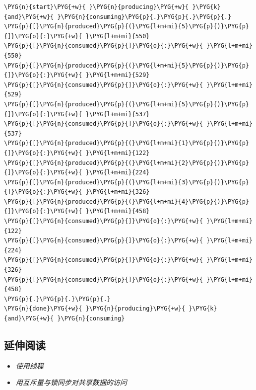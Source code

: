 \begin{codeblockbg}
\begin{Verbatim}[commandchars=\\\{\},breaklines=true,breakanywhere=true,fontsize=\codefont,xleftmargin=17bp]
\PYG{n}{start}\PYG{+w}{ }\PYG{n}{producing}\PYG{+w}{ }\PYG{k}{and}\PYG{+w}{ }\PYG{n}{consuming}\PYG{p}{.}\PYG{p}{.}\PYG{p}{.}
\PYG{p}{[}\PYG{n}{produced}\PYG{p}{(}\PYG{l+m+mi}{5}\PYG{p}{)}\PYG{p}{]}\PYG{o}{:}\PYG{+w}{ }\PYG{l+m+mi}{550}
\PYG{p}{[}\PYG{n}{consumed}\PYG{p}{]}\PYG{o}{:}\PYG{+w}{ }\PYG{l+m+mi}{550}
\PYG{p}{[}\PYG{n}{produced}\PYG{p}{(}\PYG{l+m+mi}{5}\PYG{p}{)}\PYG{p}{]}\PYG{o}{:}\PYG{+w}{ }\PYG{l+m+mi}{529}
\PYG{p}{[}\PYG{n}{consumed}\PYG{p}{]}\PYG{o}{:}\PYG{+w}{ }\PYG{l+m+mi}{529}
\PYG{p}{[}\PYG{n}{produced}\PYG{p}{(}\PYG{l+m+mi}{5}\PYG{p}{)}\PYG{p}{]}\PYG{o}{:}\PYG{+w}{ }\PYG{l+m+mi}{537}
\PYG{p}{[}\PYG{n}{consumed}\PYG{p}{]}\PYG{o}{:}\PYG{+w}{ }\PYG{l+m+mi}{537}
\PYG{p}{[}\PYG{n}{produced}\PYG{p}{(}\PYG{l+m+mi}{1}\PYG{p}{)}\PYG{p}{]}\PYG{o}{:}\PYG{+w}{ }\PYG{l+m+mi}{122}
\PYG{p}{[}\PYG{n}{produced}\PYG{p}{(}\PYG{l+m+mi}{2}\PYG{p}{)}\PYG{p}{]}\PYG{o}{:}\PYG{+w}{ }\PYG{l+m+mi}{224}
\PYG{p}{[}\PYG{n}{produced}\PYG{p}{(}\PYG{l+m+mi}{3}\PYG{p}{)}\PYG{p}{]}\PYG{o}{:}\PYG{+w}{ }\PYG{l+m+mi}{326}
\PYG{p}{[}\PYG{n}{produced}\PYG{p}{(}\PYG{l+m+mi}{4}\PYG{p}{)}\PYG{p}{]}\PYG{o}{:}\PYG{+w}{ }\PYG{l+m+mi}{458}
\PYG{p}{[}\PYG{n}{consumed}\PYG{p}{]}\PYG{o}{:}\PYG{+w}{ }\PYG{l+m+mi}{122}
\PYG{p}{[}\PYG{n}{consumed}\PYG{p}{]}\PYG{o}{:}\PYG{+w}{ }\PYG{l+m+mi}{224}
\PYG{p}{[}\PYG{n}{consumed}\PYG{p}{]}\PYG{o}{:}\PYG{+w}{ }\PYG{l+m+mi}{326}
\PYG{p}{[}\PYG{n}{consumed}\PYG{p}{]}\PYG{o}{:}\PYG{+w}{ }\PYG{l+m+mi}{458}
\PYG{p}{.}\PYG{p}{.}\PYG{p}{.}
\PYG{n}{done}\PYG{+w}{ }\PYG{n}{producing}\PYG{+w}{ }\PYG{k}{and}\PYG{+w}{ }\PYG{n}{consuming}
\end{Verbatim}
\end{codeblockbg}



\subsection{延伸阅读}



\begin{itemize}
\item \textit{使用线程}



\item \textit{用互斥量与锁同步对共享数据的访问}

\end{itemize}


